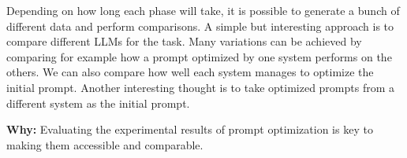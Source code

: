 Depending on how long each phase will take, it is possible to generate a bunch of different data and perform comparisons.
A simple but interesting approach is to compare different LLMs for the task.
Many variations can be achieved by comparing for example how a prompt optimized by one system performs on the others.
We can also compare how well each system manages to optimize the initial prompt.
Another interesting thought is to take optimized prompts from a different system as the initial prompt.


\textbf{Why:} Evaluating the experimental results of prompt optimization is key to making them accessible and comparable. 